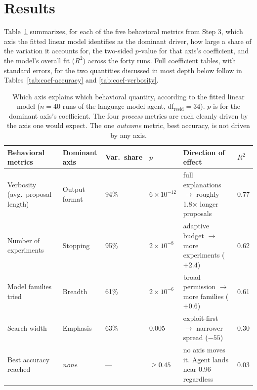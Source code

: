 \documentclass[11pt]{article}
\begin{document}
\section{Results}
\label{sec:results}

Table~\ref{tab:surrogate} summarizes, for each of the five behavioral metrics from Step 3, which axis the fitted linear model identifies as the dominant driver, how large a share of the variation it accounts for, the two-sided $p$-value for that axis's coefficient, and the model's overall fit ($R^2$) across the forty runs. Full coefficient tables, with standard errors, for the two quantities discussed in most depth below follow in Tables~\ref{tab:coef-accuracy} and \ref{tab:coef-verbosity}.

\begin{table}[h]
\centering
\small
\caption{Which axis explains which behavioral quantity, according to the fitted linear model ($n=40$ runs of the language-model agent, df$_{\text{resid}}=34$). $p$ is for the dominant axis's coefficient. The four \emph{process} metrics are each cleanly driven by the axis one would expect. The one \emph{outcome} metric, best accuracy, is not driven by any axis.}
\label{tab:surrogate}
\begin{tabular}{p{3.3cm}p{1.6cm}p{1.3cm}p{1.1cm}p{4.2cm}p{0.7cm}}
\toprule
Behavioral metrics & Dominant axis & Var.\ share & $p$ & Direction of effect & $R^2$ \\
\midrule
Verbosity (avg.\ proposal length) & Output format & 94\% & $6\times10^{-12}$ & full explanations $\to$ roughly 1.8$\times$ longer proposals & 0.77 \\
Number of experiments & Stopping & 95\% & $2\times10^{-8}$ & adaptive budget $\to$ more experiments ($+2.4$) & 0.62 \\
Model families tried & Breadth & 61\% & $2\times10^{-6}$ & broad permission $\to$ more families ($+0.6$) & 0.61 \\
Search width & Emphasis & 63\% & 0.005 & exploit-first $\to$ narrower spread ($-55$) & 0.30 \\
Best accuracy reached & \emph{none} & --- & $\ge 0.45$ & no axis moves it. Agent lands near 0.96 regardless & 0.03 \\
\bottomrule
\end{tabular}
\end{table}
\end{document}
